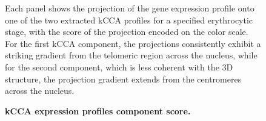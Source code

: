 \documentclass{article}
\begin{document}
\begin{figure}
\begin{center}
\end{center}
\caption{{\bf kCCA expression profiles component score.}}  { Each
  panel shows the projection of the gene expression profile onto one
  of the two extracted kCCA profiles for a specified erythrocytic
  stage, with the score of the projection encoded on the color
  scale. For the first kCCA component, the projections consistently
  exhibit a striking gradient from the telomeric region across
  the nucleus, while for the second component, which is less coherent
  with the 3D structure, the projection gradient extends from the
  centromeres across the nucleus.  }
\label{suppfig:kCCAsecond}
\end{figure}
\clearpage
\end{document}
